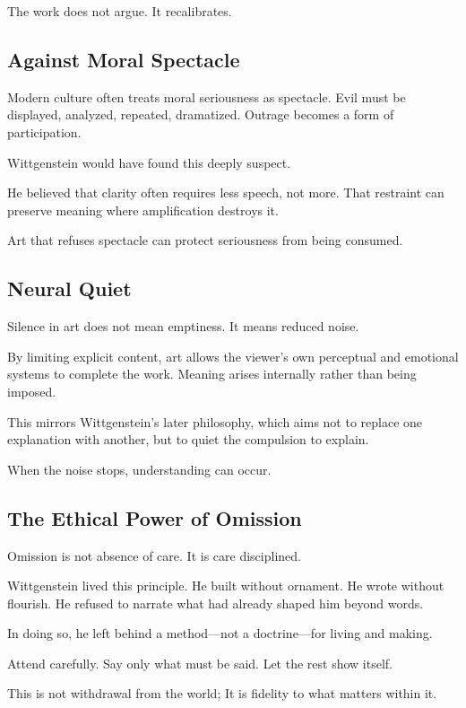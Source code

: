 \documentclass[11pt]{article}
\begin{document}
The work does not argue. It recalibrates.

\subsection*{Against Moral Spectacle}

Modern culture often treats moral seriousness as spectacle. Evil must be displayed, analyzed, repeated, dramatized. Outrage becomes a form of participation.

Wittgenstein would have found this deeply suspect.

He believed that clarity often requires less speech, not more. That restraint can preserve meaning where amplification destroys it.

Art that refuses spectacle can protect seriousness from being consumed.

\subsection*{Neural Quiet}

Silence in art does not mean emptiness. It means reduced noise.

By limiting explicit content, art allows the viewer’s own perceptual and emotional systems to complete the work. Meaning arises internally rather than being imposed.

This mirrors Wittgenstein’s later philosophy, which aims not to replace one explanation with another, but to quiet the compulsion to explain.

When the noise stops, understanding can occur.

\subsection*{The Ethical Power of Omission}

Omission is not absence of care. It is care disciplined.

Wittgenstein lived this principle. He built without ornament. He wrote without flourish. He refused to narrate what had already shaped him beyond words.

In doing so, he left behind a method—not a doctrine—for living and making.

Attend carefully.  
Say only what must be said.  
Let the rest show itself.

This is not withdrawal from the world; It is fidelity to what matters within it.
\end{document}

